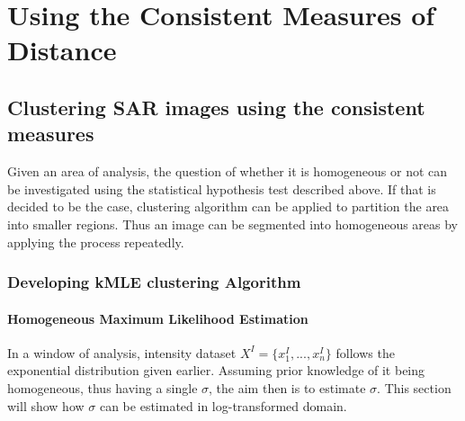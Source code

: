 \chapter{Using the Consistent Measures of Distance} %
\label{chap:applications}

\section{Clustering SAR images using the consistent measures}

\label{sec:k_mle}

Given an area of analysis, 
  the question of whether it is homogeneous or not can be investigated using
the statistical hypothesis test described above. 
If that is decided to be the case, clustering algorithm can be applied to partition the area into smaller regions. 
Thus an image can be segmented into homogeneous areas by applying the process repeatedly.


\subsection{Developing kMLE clustering Algorithm}

\subsubsection{Homogeneous Maximum Likelihood Estimation}

In a window of analysis, intensity dataset $X^I=\{x^I_1,...,x^I_n\}$ follows the exponential distribution given earlier. 
Assuming prior knowledge of it being homogeneous, thus having a single $\sigma$, the aim then is to estimate $\sigma$. 
This section will show how $\sigma$ can be estimated in log-transformed domain.


